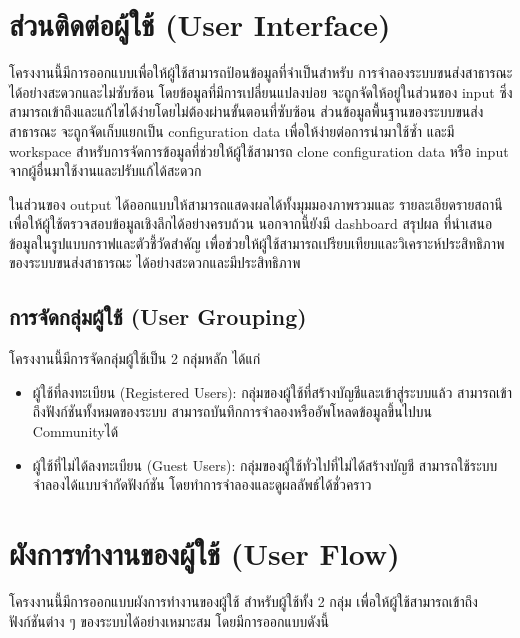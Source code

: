 \section{ส่วนติดต่อผู้ใช้ (User Interface)}
\begin{mypara}
    \indent โครงงานนี้มีการออกแบบเพื่อให้ผู้ใช้สามารถป้อนข้อมูลที่จำเป็นสำหรับ
    การจำลองระบบขนส่งสาธารณะได้อย่างสะดวกและไม่ซับซ้อน 
    โดยข้อมูลที่มีการเปลี่ยนแปลงบ่อย จะถูกจัดให้อยู่ในส่วนของ input 
    ซึ่งสามารถเข้าถึงและแก้ไขได้ง่ายโดยไม่ต้องผ่านขั้นตอนที่ซับซ้อน 
    ส่วนข้อมูลพื้นฐานของระบบขนส่งสาธารณะ จะถูกจัดเก็บแยกเป็น configuration data 
    เพื่อให้ง่ายต่อการนำมาใช้ซ้ำ และมี workspace สำหรับการจัดการข้อมูลที่ช่วยให้ผู้ใช้สามารถ 
    clone configuration data หรือ input จากผู้อื่นมาใช้งานและปรับแก้ได้สะดวก

  \indent ในส่วนของ output ได้ออกแบบให้สามารถแสดงผลได้ทั้งมุมมองภาพรวมและ
  รายละเอียดรายสถานี เพื่อให้ผู้ใช้ตรวจสอบข้อมูลเชิงลึกได้อย่างครบถ้วน นอกจากนี้ยังมี 
  dashboard สรุปผล ที่นำเสนอข้อมูลในรูปแบบกราฟและตัวชี้วัดสำคัญ 
  เพื่อช่วยให้ผู้ใช้สามารถเปรียบเทียบและวิเคราะห์ประสิทธิภาพของระบบขนส่งสาธารณะ
  ได้อย่างสะดวกและมีประสิทธิภาพ
\end{mypara}

\subsection{การจัดกลุ่มผู้ใช้ (User Grouping)}
\begin{mypara}
\indent โครงงานนี้มีการจัดกลุ่มผู้ใช้เป็น 2 กลุ่มหลัก ได้แก่
\begin{itemize}
    \item ผู้ใช้ที่ลงทะเบียน (Registered Users): กลุ่มของผู้ใช้ที่สร้างบัญชีและเข้าสู่ระบบแล้ว 
    สามารถเข้าถึงฟังก์ชันทั้งหมดของระบบ สามารถบันทึกการจำลองหรืออัพโหลดข้อมูลขึ้นไปบน Communityได้ 
    \item ผู้ใช้ที่ไม่ได้ลงทะเบียน (Guest Users): กลุ่มของผู้ใช้ทั่วไปที่ไม่ได้สร้างบัญชี 
    สามารถใช้ระบบจำลองได้แบบจำกัดฟังก์ชัน โดยทำการจำลองและดูผลลัพธ์ได้ชั่วคราว 
\end{itemize}
\end{mypara}
\section{ผังการทำงานของผู้ใช้ (User Flow)}
\begin{mypara}
    \indent โครงงานนี้มีการออกแบบผังการทำงานของผู้ใช้ สำหรับผู้ใช้ทั้ง 2 กลุ่ม เพื่อให้ผู้ใช้สามารถเข้าถึงฟังก์ชันต่าง ๆ ของระบบได้อย่างเหมาะสม 
    โดยมีการออกแบบดังนี้
\end{mypara}
